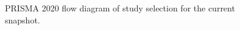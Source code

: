 \begin{figure}
\centering

\caption{PRISMA 2020 flow diagram of study selection for the current snapshot.}
\label{fig:prisma}
\end{figure}
